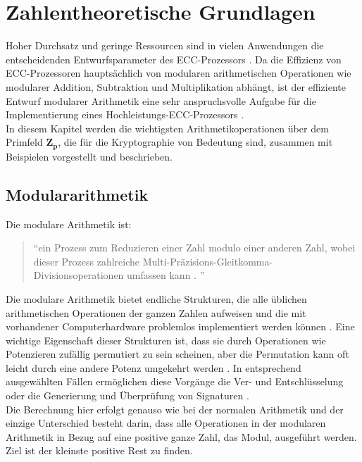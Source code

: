 \chapter{Zahlentheoretische Grundlagen}

Hoher Durchsatz und geringe Ressourcen sind in vielen Anwendungen die entscheidenden Entwurfsparameter des ECC-Prozessors \cite{Hossain2019}.
Da die Effizienz von ECC-Prozessoren hauptsächlich von modularen
arithmetischen Operationen wie modularer Addition, Subtraktion und Multiplikation abhängt, ist der effiziente Entwurf modularer
Arithmetik eine sehr anspruchsvolle Aufgabe für die
Implementierung eines Hochleistungs-ECC-Prozessors \cite{Hossain2019}.\\ 

In diesem Kapitel werden die wichtigsten Arithmetikoperationen  über dem Primfeld $ \mathbf{ Z_p } $, die für die Kryptographie von Bedeutung sind, zusammen mit Beispielen vorgestellt und beschrieben. 

\section{Modulararithmetik}

Die modulare Arithmetik ist:
\begin{quote} \enquote{ein Prozess zum Reduzieren einer Zahl modulo einer
anderen Zahl, wobei dieser Prozess zahlreiche
Multi-Präzisions-Gleitkomma-Divisionsoperationen
umfassen kann \cite{patent}.
}\end{quote} 
Die modulare Arithmetik bietet endliche Strukturen, die alle üblichen arithmetischen Operationen der ganzen Zahlen aufweisen und die mit vorhandener Computerhardware problemlos implementiert werden können \cite{Contini2011}.
Eine wichtige Eigenschaft dieser Strukturen ist, dass sie durch Operationen wie Potenzieren zufällig permutiert zu sein scheinen, aber die Permutation kann oft leicht durch eine andere Potenz umgekehrt werden \cite{Contini2011}.
In entsprechend ausgewählten Fällen ermöglichen diese Vorgänge die Ver- und
Entschlüsselung oder die Generierung und Überprüfung von Signaturen
\cite{Contini2011}.\\

Die Berechnung hier erfolgt genauso wie bei der normalen Arithmetik
und der einzige Unterschied besteht darin, dass  alle
Operationen in der modularen Arithmetik in Bezug auf eine
positive ganze Zahl, das Modul, ausgeführt werden.
Ziel ist der kleinste positive Rest zu finden. \\

